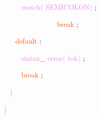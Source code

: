 \documentclass[8, usernames, dvipsnames]{beamer}
\begin{document}
\begin{frame}
\textcolor{White}{\   }
\textcolor{White}{\   }
\textcolor{White}{\   }
\textcolor{Violet}{match}\textcolor{SkyBlue}{(}
\textcolor{Violet}{SEMICOLON}\textcolor{SkyBlue}{)}
\textcolor{Sepia}{;}

 \textcolor{White}{\   }
\textcolor{White}{\   }
\textcolor{White}{\ }
\textcolor{White}{\ }
\textcolor{White}{\ }
\textcolor{White}{\ }
\textcolor{White}{\   }
\textcolor{White}{\   }
\textcolor{White}{\   }
\textcolor{OrangeRed}{break}
\textcolor{Sepia}{;}

 \textcolor{White}{\   }
\textcolor{White}{\   }
\textcolor{OrangeRed}{default}
\textcolor{Sepia}{:}

 \textcolor{White}{\   }
\textcolor{White}{\   }
\textcolor{White}{\   }
\textcolor{Violet}{sintax}\textcolor{Sepia}{\_}
\textcolor{Violet}{error}\textcolor{SkyBlue}{(}
\textcolor{Violet}{tok}\textcolor{SkyBlue}{)}
\textcolor{Sepia}{;}

 \textcolor{White}{\   }
\textcolor{White}{\   }
\textcolor{White}{\   }
\textcolor{OrangeRed}{break}
\textcolor{Sepia}{;}

 
 \textcolor{White}{\   }
\textcolor{SkyBlue}{\} }

 \textcolor{SkyBlue}{\} }

 
 
 \end{frame}
\end{document}
